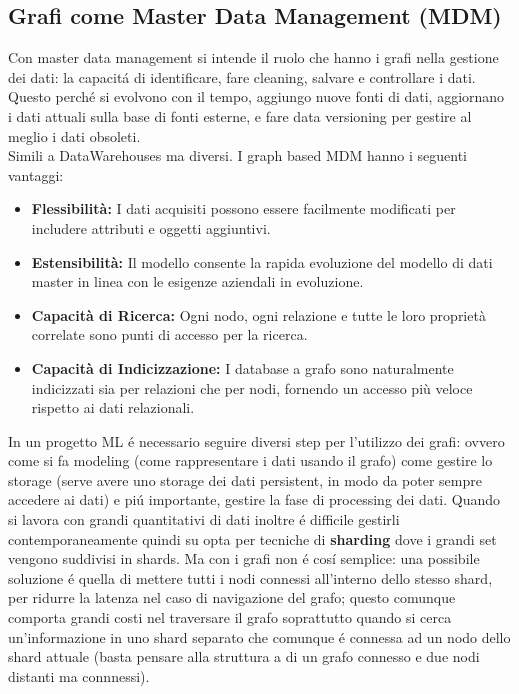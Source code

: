 \subsection{Grafi come Master Data Management (MDM)}
Con master data management si intende il ruolo che hanno i grafi nella gestione dei dati: la capacitá di identificare, fare cleaning, salvare e controllare i dati. Questo perché si evolvono con il tempo, aggiungo nuove fonti di dati, aggiornano i dati attuali sulla base di fonti esterne, e fare data versioning per gestire al meglio i dati obsoleti. 
\\
Simili a DataWarehouses ma diversi. I graph based MDM hanno i seguenti vantaggi:
\begin{itemize}
    \item \textbf{Flessibilità:} I dati acquisiti possono essere facilmente modificati per includere attributi e oggetti aggiuntivi.
    
    \item \textbf{Estensibilità:} Il modello consente la rapida evoluzione del modello di dati master in linea con le esigenze aziendali in evoluzione.
    
    \item \textbf{Capacità di Ricerca:} Ogni nodo, ogni relazione e tutte le loro proprietà correlate sono punti di accesso per la ricerca.
    
    \item \textbf{Capacità di Indicizzazione:} I database a grafo sono naturalmente indicizzati sia per relazioni che per nodi, fornendo un accesso più veloce rispetto ai dati relazionali.
\end{itemize}

In un progetto ML é necessario seguire diversi step per l'utilizzo dei grafi: ovvero come si fa modeling (come rappresentare i dati usando il grafo) come gestire lo storage (serve avere uno storage dei dati persistent, in modo da poter sempre accedere ai dati)  e piú importante, gestire la fase di processing dei dati. Quando si lavora con grandi quantitativi di dati inoltre é difficile gestirli contemporaneamente quindi su opta per tecniche di \textbf{sharding} dove i grandi set vengono suddivisi in shards. Ma con i grafi non é cosí semplice: una possibile soluzione é quella di mettere tutti i nodi connessi all'interno dello stesso shard, per ridurre la latenza nel caso di navigazione del grafo; questo comunque comporta grandi costi nel traversare il grafo soprattutto quando si cerca un'informazione in uno shard separato che comunque é connessa ad un nodo dello shard attuale (basta pensare alla struttura a di un grafo connesso e due nodi distanti ma connnessi). 

